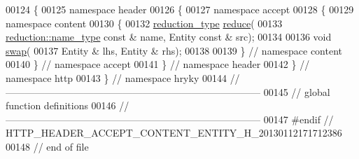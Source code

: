 \begin{DoxyCode}
00124 \{
00125 \textcolor{keyword}{namespace }header
00126 \{
00127 \textcolor{keyword}{namespace }accept
00128 \{
00129 \textcolor{keyword}{namespace }content
00130 \{
00132     \hyperlink{namespacehryky_a343a9a4c36a586be5c2693156200eadc}{reduction_type} \hyperlink{namespacehryky_1_1http_a08fc36a78a8e2908140fcd102829a566}{reduce}(
00133         \hyperlink{namespacehryky_1_1reduction_ac686c30a4c8d196bbd0f05629a6b921f}{reduction::name_type} \textcolor{keyword}{const} & name, Entity \textcolor{keyword}{const} & src);
00134 
00136     \textcolor{keywordtype}{void} \hyperlink{namespacehryky_1_1http_a38e62595ad532d18fbc65ceb61973aec}{swap}(
00137         Entity & lhs, Entity & rhs);
00138 
00139 \} \textcolor{comment}{// namespace content}
00140 \} \textcolor{comment}{// namespace accept}
00141 \} \textcolor{comment}{// namespace header}
00142 \} \textcolor{comment}{// namespace http}
00143 \} \textcolor{comment}{// namespace hryky}
00144 \textcolor{comment}{//
      ------------------------------------------------------------------------------}
00145 \textcolor{comment}{// global function definitions}
00146 \textcolor{comment}{//
      ------------------------------------------------------------------------------}
00147 \textcolor{preprocessor}{#endif // HTTP\_HEADER\_ACCEPT\_CONTENT\_ENTITY\_H\_20130112171712386}
00148 \textcolor{preprocessor}{}\textcolor{comment}{// end of file}
\end{DoxyCode}

